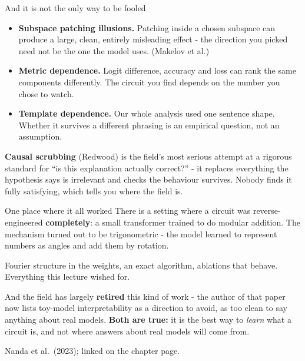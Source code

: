 \documentclass[aspectratio=169]{beamer}
\newcommand{\watchbox}[1]{%
  \begin{tcolorbox}[colback=armorange!12, colframe=armorange, boxrule=0.6pt, arc=2pt]
  #1
  \end{tcolorbox}}
\begin{document}
\begin{frame}{And it is not the only way to be fooled}
  \vspace{0.6em}
  \begin{itemize}
    \item \textbf{Subspace patching illusions.} Patching inside a chosen subspace can produce a
      large, clean, entirely misleading effect - the direction you picked need not be the one the
      model uses. (Makelov et al.)
    \item \textbf{Metric dependence.} Logit difference, accuracy and loss can rank the same
      components differently. The circuit you find depends on the number you chose to watch.
    \item \textbf{Template dependence.} Our whole analysis used one sentence shape. Whether it
      survives a different phrasing is an empirical question, not an assumption.
  \end{itemize}

  \vspace{0.8em}
  \watchbox{\textbf{Causal scrubbing} (Redwood) is the field's most serious attempt at a rigorous
  standard for ``is this explanation actually correct?'' - it replaces everything the hypothesis
  says is irrelevant and checks the behaviour survives. Nobody finds it fully satisfying, which
  tells you where the field is.}
\end{frame}

\begin{frame}{One place where it all worked}
  \vspace{0.7em}
  There is a setting where a circuit was reverse-engineered \textbf{completely}: a small
  transformer trained to do modular addition. The mechanism turned out to be trigonometric -
  the model learned to represent numbers as angles and add them by rotation.

  \vspace{0.5em}
  Fourier structure in the weights, an exact algorithm, ablations that behave. Everything this
  lecture wished for.

  \vspace{0.6em}
  \watchbox{\small And the field has largely \textbf{retired} this kind of work - the author of
  that paper now lists toy-model interpretability as a direction to avoid, as too clean to say
  anything about real models. \textbf{Both are true:} it is the best way to \emph{learn} what a
  circuit is, and not where answers about real models will come from.}

  \vspace{0.2em}
  {\footnotesize Nanda et al.\ (2023); linked on the chapter page.}
\end{frame}
\end{document}
